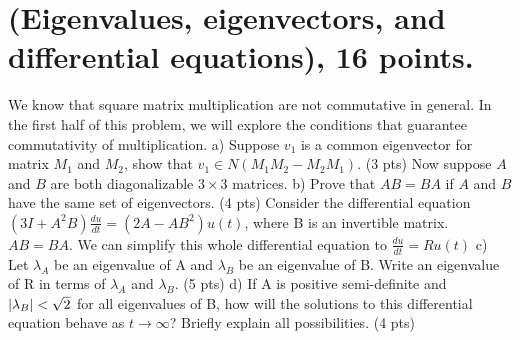 \documentclass{article}
\DeclarePairedDelimiter\abs{\lvert}{\rvert}%
\begin{document}
\section{(Eigenvalues, eigenvectors, and differential equations), 16 points.}
\newline We know that square matrix multiplication are not commutative in general. In the first half of this problem, we will explore the conditions that guarantee commutativity of multiplication.
\newline
\newline a) Suppose \(v_1\) is a common eigenvector for matrix \(M_1\) and \(M_2\), show that \(v_1 \in N(M_1M_2-M_2M_1)\). (3 pts)
\newline
\newline Now suppose \(A\) and \(B\) are both diagonalizable \( 3 \times 3\) matrices.
\newline
\newline b) Prove that \(AB = BA\) if \(A\) and \(B\) have the same set of eigenvectors. (4 pts)
\newline
\newline Consider the differential equation \((3I+A^2B)\frac{du}{dt} = (2A-AB^2)u(t)  \), where B is an invertible matrix. \(AB = BA.\) We can simplify this whole differential equation to \(\frac{du}{dt} = Ru(t)\)
\newline
\newline c) Let \(\lambda_A\) be an eigenvalue of A and \(\lambda_B\) be an eigenvalue of B. Write an eigenvalue of R in terms of \(\lambda_A\) and \(\lambda_B\). (5 pts)
\newline 
\newline d) If A is positive semi-definite and \(\abs{\lambda_B} < \sqrt{2}\) for all eigenvalues of B, how will the solutions to this differential equation behave as \(t \rightarrow{\infty} \)? Briefly explain all possibilities. (4 pts)
\newline
\end{document}
